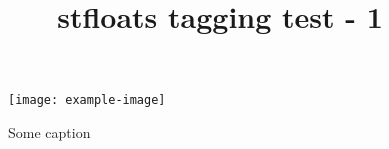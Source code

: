 \documentclass[twocolumn]{article}
\title{stfloats tagging test - 1}
\begin{document}
\kant[1-2]
\begin{figure*}[b]
\centering
\texttt{[image: example-image]}
\caption{Some caption}
\end{figure*}
\kant[3-4]
\end{document}
